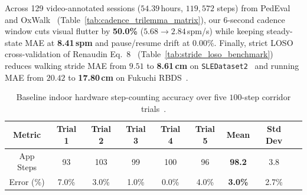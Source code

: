 Across 129 video-annotated sessions ($54.39$\,hours, $119{,}572$ steps) from PedEval~\cite{mattfeld2021pedeval} and OxWalk~\cite{oxwalk2022oxford} (Table~\ref{tab:cadence_trilemma_matrix}), our $6$-second cadence window cuts visual flutter by \textbf{50.0\%} ($5.68 \to 2.84$\,spm/s) while keeping steady-state MAE at \textbf{8.41\,spm} and pause/resume drift at $0.00\%$. Finally, strict LOSO cross-validation of Renaudin Eq.~8~\cite{renaudin2012step} (Table~\ref{tab:stride_loso_benchmark}) reduces walking stride MAE from $9.51$ to \textbf{8.61\,cm} on \texttt{SLEDataset2}~\cite{vezocnik2021sle} and running MAE from $20.42$ to \textbf{17.80\,cm} on Fukuchi RBDS~\cite{fukuchi2017public}.

\begin{table}[htbp]
\centering
\caption{Baseline indoor hardware step-counting accuracy over five $100$-step corridor trials~\cite{aetron2026prethesis}.}
\label{tab:manual_step_trials}
\begin{tabular}{@{}ccccccccc@{}}
\toprule
\textbf{Metric} & \textbf{Trial 1} & \textbf{Trial 2} & \textbf{Trial 3} & \textbf{Trial 4} & \textbf{Trial 5} & \textbf{Mean} & \textbf{Std Dev} \\ \midrule
App Steps & 93 & 103 & 99 & 100 & 96 & \textbf{98.2} & 3.8 \\
Error (\%) & 7.0\% & 3.0\% & 1.0\% & 0.0\% & 4.0\% & \textbf{3.0\%} & 2.7\% \\ \bottomrule
\end{tabular}
\end{table}

\begin{table}[htbp]
\centering
\caption{Causal Step Counting \& Stationary False-Step Rejection (Oxford WPD, Xu Group~3, Adversarial Suite).}
\label{tab:step_mvglrt_benchmark}
\end{table}

